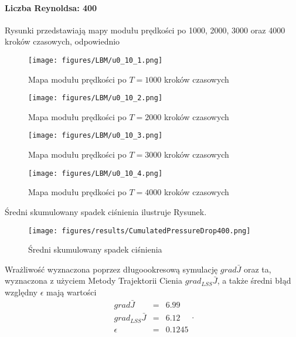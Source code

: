 \documentclass[12pt]{article}
\begin{document}
\paragraph{Liczba Reynoldsa: 400}
Rysunki przedstawiają mapy modułu prędkości po 1000, 2000, 3000 oraz 4000 kroków czasowych, odpowiednio 
\begin{figure}[H]
	\texttt{[image: figures/LBM/u0\_10\_1.png]} 
	\caption{Mapa modułu prędkości po $ T=1000 $ kroków czasowych}
\end{figure}
\begin{figure}[H]
	\texttt{[image: figures/LBM/u0\_10\_2.png]} 
	\caption{Mapa modułu prędkości po $ T=2000 $ kroków czasowych}
\end{figure}
\begin{figure}[H]
	\texttt{[image: figures/LBM/u0\_10\_3.png]} 
	\caption{Mapa modułu prędkości po $ T=3000 $ kroków czasowych}
\end{figure}
\begin{figure}[H]
	\texttt{[image: figures/LBM/u0\_10\_4.png]} 
	\caption{Mapa modułu prędkości po $ T=4000 $ kroków czasowych}
\end{figure}
Średni skumulowany spadek ciśnienia ilustruje Rysunek.
\begin{figure}[H]
	\texttt{[image: figures/results/CumulatedPressureDrop400.png]} 
	\centering
	\caption{Średni skumulowany spadek ciśnienia}
\end{figure}
Wrażliwość wyznaczona poprzez długoookresową symulację $ grad\bar{J} $ oraz ta, wyznaczona z użyciem Metody Trajektorii Cienia $ grad_{LSS}\bar{J} $, a także średni błąd względny $ \epsilon $ mają wartości
\begin{equation}
\begin{array}{rcl}
grad\bar{J} &=& 6.99 \\
grad_{LSS}\bar{J} &=& 6.12 \\
\epsilon &=& 0.1245
\end{array} .
\label{result400}
\end{equation}
\end{document}
